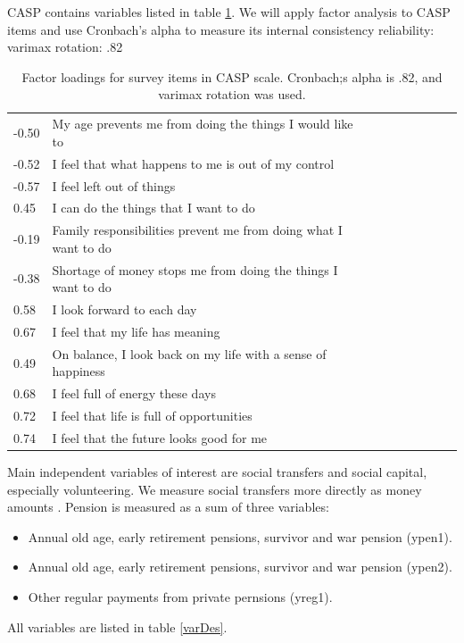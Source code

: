 \documentclass[10pt, letterpaper]{article}
\begin{document}
\begin{spacing}{1.4}
CASP contains  variables listed in table \ref{casp}. We will apply factor
analysis to CASP items and use  Cronbach's alpha to measure its  internal
consistency reliability: 
varimax rotation: .82 


\begin{table}[h!]
  \centering
  \begin{tabular}{lllllllll} %
\hline
  -0.50& My age prevents me from doing the things I would like to\\
  -0.52& I feel that what happens to me is out of my control\\
  -0.57& I feel left out of things\\
   0.45& I can do the things that I want to do\\
  -0.19& Family responsibilities prevent me from doing what I want to do\\
  -0.38& Shortage of money stops me from doing the things I want to do\\
   0.58& I look forward to each day\\
   0.67& I feel that my life has meaning\\
   0.49& On balance, I look back on my life with a sense of happiness\\
   0.68& I feel full of energy these days\\
   0.72& I feel that life is full of opportunities\\
   0.74& I feel that the future looks good for me\\\hline
  \end{tabular}
  \caption{Factor loadings for survey items in CASP scale. Cronbach;s alpha is
    .82, and varimax rotation was used.}
  \label{casp}
\end{table}



Main independent variables of interest are social transfers and social capital,
especially volunteering. We  measure social transfers more directly as money amounts %
. Pension is measured as a sum of three variables:
\begin{itemize}
\item Annual old age, early retirement pensions, survivor and
war pension (ypen1). %
\item Annual old age, early retirement pensions, survivor and war pension (ypen2). %
\item Other regular payments from private pernsions (yreg1). %
\end{itemize}
 All variables are listed in table \ref{varDes}.


\end{spacing}
\end{document}
